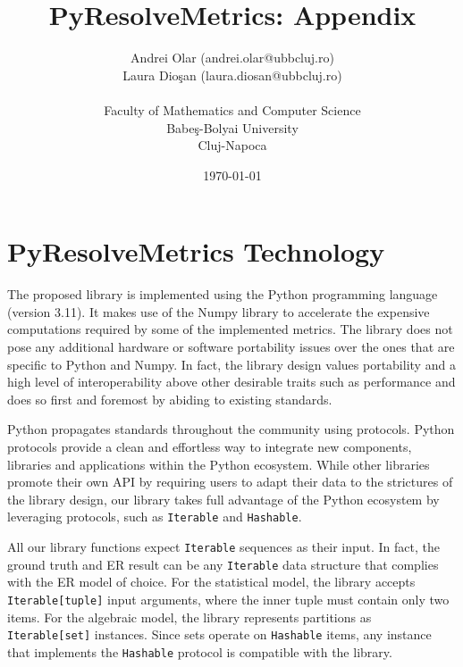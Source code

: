 \documentclass{article}
\title{PyResolveMetrics: Appendix}
\author{
    Andrei Olar (andrei.olar@ubbcluj.ro)\\
    Laura Dio\c san (laura.diosan@ubbcluj.ro)\\
    \\
    Faculty of Mathematics and Computer Science\\
    Babe\c s-Bolyai University\\
    Cluj-Napoca
}
\date{\today}
\begin{document}
\maketitle

\section{PyResolveMetrics Technology}\label{appendix:sec:technology}
    The proposed library is implemented using the Python programming
    language (version 3.11)\cite{python}.
    It makes use of the Numpy library\cite{harris2020numpy} to accelerate
    the expensive computations required by some of the implemented metrics.
    The library does not pose any additional hardware or software portability
    issues over the ones that are specific to Python and Numpy.
    In fact, the library design values portability and a high level of
    interoperability above other desirable traits such as performance and does
    so first and foremost by abiding to existing standards.

    Python propagates standards throughout the community using protocols.
    Python protocols\cite{pyproto2017} provide a clean and effortless way to
    integrate new components, libraries and applications within the Python
    ecosystem.
    While other libraries\cite{nmeth2020scipy} promote their own API by
    requiring users to adapt their data to the strictures of the library design,
    our library takes full advantage of the Python ecosystem by leveraging
    protocols, such as \texttt{Iterable} and \texttt{Hashable}.

    All our library functions expect \texttt{Iterable} sequences as their input.
    In fact, the ground truth and ER result can be any
    \texttt{Iterable} data structure that complies with the ER
    model of choice.
    For the statistical model, the library accepts \texttt{Iterable[tuple]}
    input arguments, where the inner tuple must contain only two items.
    For the algebraic model, the library represents partitions as
    \texttt{Iterable[set]} instances.
    Since sets operate on \texttt{Hashable} items, any instance that implements
    the \texttt{Hashable} protocol is compatible with the library.
    
\end{document}
